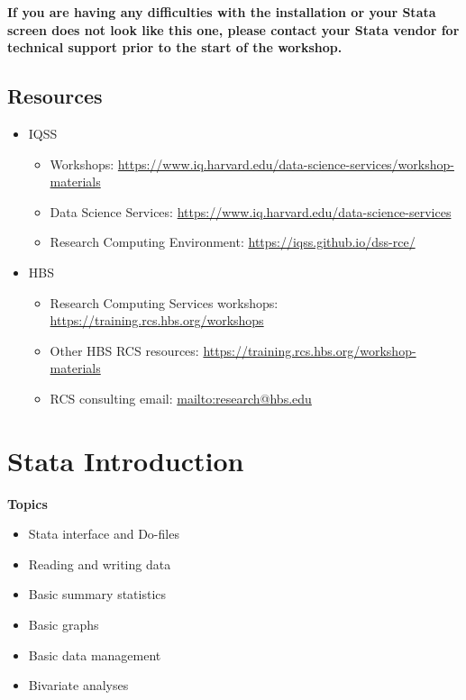 \documentclass[
]{book}
\providecommand{\tightlist}{%
  \setlength{\itemsep}{0pt}\setlength{\parskip}{0pt}}
\begin{document}
\begin{alert}

\textbf{If you are having any difficulties with the installation or your Stata screen does not look like this one, please contact your Stata vendor for technical support prior to the start of the workshop.}

\end{alert}

\hypertarget{resources-9}{%
\section{Resources}\label{resources-9}}

\begin{itemize}
\tightlist
\item
  IQSS

  \begin{itemize}
  \tightlist
  \item
    Workshops: \url{https://www.iq.harvard.edu/data-science-services/workshop-materials}
  \item
    Data Science Services: \url{https://www.iq.harvard.edu/data-science-services}
  \item
    Research Computing Environment: \url{https://iqss.github.io/dss-rce/}
  \end{itemize}
\item
  HBS

  \begin{itemize}
  \tightlist
  \item
    Research Computing Services workshops: \url{https://training.rcs.hbs.org/workshops}
  \item
    Other HBS RCS resources: \url{https://training.rcs.hbs.org/workshop-materials}
  \item
    RCS consulting email: \url{mailto:research@hbs.edu}
  \end{itemize}
\end{itemize}

\hypertarget{stata-introduction}{%
\chapter{Stata Introduction}\label{stata-introduction}}

\textbf{Topics}

\begin{itemize}
\tightlist
\item
  Stata interface and Do-files
\item
  Reading and writing data
\item
  Basic summary statistics
\item
  Basic graphs
\item
  Basic data management
\item
  Bivariate analyses
\end{itemize}
\end{document}

